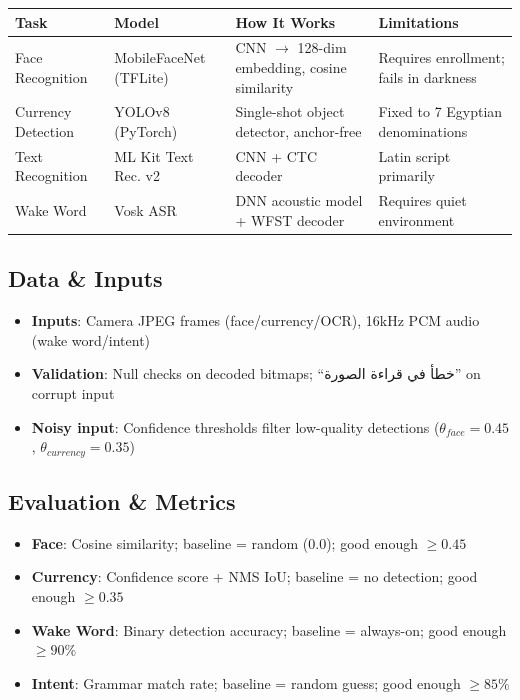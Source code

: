 \documentclass[12pt,a4paper]{article}
\begin{document}
\begin{table}[h]
\centering
\begin{tabular}{p{3cm}p{3cm}p{3cm}p{3cm}}
\toprule
\textbf{Task} & \textbf{Model} & \textbf{How It Works} & \textbf{Limitations} \\
\midrule
Face Recognition & MobileFaceNet (TFLite) & CNN $\rightarrow$ 128-dim embedding, cosine similarity & Requires enrollment; fails in darkness \\
Currency Detection & YOLOv8 (PyTorch) & Single-shot object detector, anchor-free & Fixed to 7 Egyptian denominations \\
Text Recognition & ML Kit Text Rec. v2 & CNN + CTC decoder & Latin script primarily \\
Wake Word & Vosk ASR & DNN acoustic model + WFST decoder & Requires quiet environment \\
\bottomrule
\end{tabular}
\end{table}

\subsection{Data \& Inputs}
\begin{itemize}
  \item \textbf{Inputs}: Camera JPEG frames (face/currency/OCR), 16kHz PCM audio (wake word/intent)
  \item \textbf{Validation}: Null checks on decoded bitmaps; ``خطأ في قراءة الصورة'' on corrupt input
  \item \textbf{Noisy input}: Confidence thresholds filter low-quality detections ($\theta_{face}=0.45$, $\theta_{currency}=0.35$)
\end{itemize}

\subsection{Evaluation \& Metrics}
\begin{itemize}
  \item \textbf{Face}: Cosine similarity; baseline = random (0.0); good enough $\geq 0.45$
  \item \textbf{Currency}: Confidence score + NMS IoU; baseline = no detection; good enough $\geq 0.35$
  \item \textbf{Wake Word}: Binary detection accuracy; baseline = always-on; good enough $\geq 90\%$
  \item \textbf{Intent}: Grammar match rate; baseline = random guess; good enough $\geq 85\%$
\end{itemize}
\end{document}

